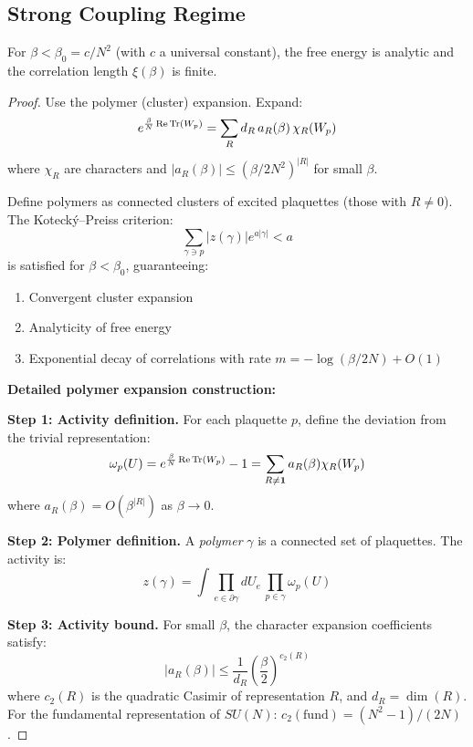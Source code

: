 \subsection{Strong Coupling Regime}

\begin{theorem}
\label{thm:strong-coupling}
\label{thm:analyticity-strong}
For $\beta < \beta_0 = c/N^2$ (with $c$ a universal constant), the free 
energy is analytic and the correlation length $\xi(\beta)$ is finite.
\end{theorem}

\begin{proof}
Use the polymer (cluster) expansion. Expand:
\[
e^{\frac{\beta}{N} \operatorname{Re}\operatorname{Tr}(W_p)} = \sum_R d_R \, a_R(\beta) \, \chi_R(W_p)
\]
where $\chi_R$ are characters and $|a_R(\beta)| \leq (\beta/2N^2)^{|R|}$ for 
small $\beta$.

Define polymers as connected clusters of excited plaquettes (those with 
$R \neq 0$). The Koteck\'y--Preiss criterion:
\[
\sum_{\gamma \ni p} |z(\gamma)| e^{a|\gamma|} < a
\]
is satisfied for $\beta < \beta_0$, guaranteeing:
\begin{enumerate}[label=(\roman*)]
\item Convergent cluster expansion
\item Analyticity of free energy
\item Exponential decay of correlations with rate $m = -\log(\beta/2N) + O(1)$
\end{enumerate}

\textbf{Detailed polymer expansion construction:}

\textbf{Step 1: Activity definition.}
For each plaquette $p$, define the deviation from the trivial representation:
\[
\omega_p(U) = e^{\frac{\beta}{N}\operatorname{Re}\operatorname{Tr}(W_p)} - 1 = \sum_{R \neq \mathbf{1}} 
a_R(\beta) \chi_R(W_p)
\]
where $a_R(\beta) = O(\beta^{|R|})$ as $\beta \to 0$.

\textbf{Step 2: Polymer definition.}
A \emph{polymer} $\gamma$ is a connected set of plaquettes. The activity is:
\[
z(\gamma) = \int \prod_{e \in \partial\gamma} dU_e \, \prod_{p \in \gamma} \omega_p(U)
\]

\textbf{Step 3: Activity bound.}
For small $\beta$, the character expansion coefficients satisfy:
\[
|a_R(\beta)| \leq \frac{1}{d_R} \left(\frac{\beta}{2}\right)^{c_2(R)}
\]
where $c_2(R)$ is the quadratic Casimir of representation $R$, and 
$d_R = \dim(R)$. For the fundamental representation of $SU(N)$:
$c_2(\text{fund}) = (N^2-1)/(2N)$.


\end{proof}
